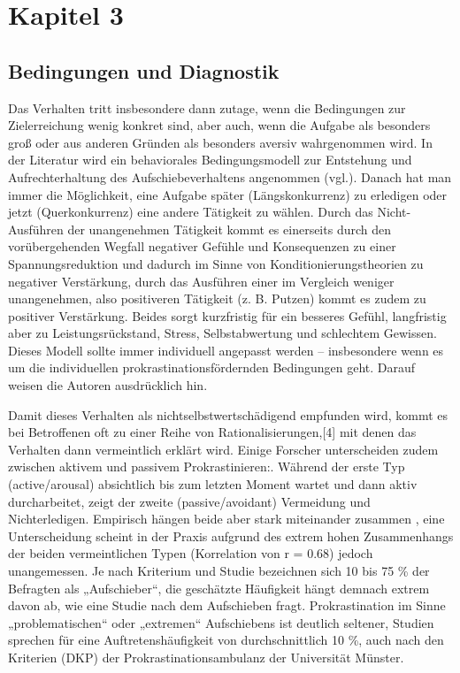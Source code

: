 \chapter{Kapitel 3}
\label{cha:kapitel-3}

\section{Bedingungen und Diagnostik}
\label{sec:diagnostik}
Das Verhalten tritt insbesondere dann zutage, wenn die Bedingungen zur Zielerreichung wenig konkret sind, aber auch, wenn die Aufgabe als besonders groß oder aus anderen Gründen als besonders aversiv wahrgenommen wird. In der Literatur wird ein behaviorales Bedingungsmodell zur Entstehung und Aufrechterhaltung des Aufschiebeverhaltens angenommen (vgl.\cite{hoecker:2013}). Danach hat man immer die Möglichkeit, eine Aufgabe später (Längskonkurrenz) zu erledigen oder jetzt (Querkonkurrenz) eine andere Tätigkeit zu wählen. Durch das Nicht-Ausführen der unangenehmen Tätigkeit kommt es einerseits durch den vorübergehenden Wegfall negativer Gefühle und Konsequenzen zu einer Spannungsreduktion und dadurch im Sinne von Konditionierungstheorien zu negativer Verstärkung, durch das Ausführen einer im Vergleich weniger unangenehmen, also positiveren Tätigkeit (z. B. Putzen) kommt es zudem zu positiver Verstärkung. Beides sorgt kurzfristig für ein besseres Gefühl, langfristig aber zu Leistungsrückstand, Stress, Selbstabwertung und schlechtem Gewissen. Dieses Modell sollte immer individuell angepasst werden – insbesondere wenn es um die individuellen prokrastinationsfördernden Bedingungen geht. Darauf weisen die Autoren ausdrücklich hin.

Damit dieses Verhalten als nichtselbstwertschädigend empfunden wird, kommt es bei Betroffenen oft zu einer Reihe von Rationalisierungen,[4] mit denen das Verhalten dann vermeintlich erklärt wird. Einige Forscher unterscheiden zudem zwischen aktivem und passivem Prokrastinieren:\cite{wiki}. Während der erste Typ (active/arousal) absichtlich bis zum letzten Moment wartet und dann aktiv durcharbeitet, zeigt der zweite (passive/avoidant) Vermeidung und Nichterledigen. Empirisch hängen beide aber stark miteinander zusammen \cite{wiki}, eine Unterscheidung scheint in der Praxis aufgrund des extrem hohen Zusammenhangs der beiden vermeintlichen Typen (Korrelation von r = 0.68) jedoch unangemessen\cite{wiki}. Je nach Kriterium und Studie bezeichnen sich 10 bis 75 \% der Befragten als „Aufschieber“, die geschätzte Häufigkeit hängt demnach extrem davon ab, wie eine Studie nach dem Aufschieben fragt\cite{wiki}. Prokrastination im Sinne „problematischen“ oder „extremen“ Aufschiebens ist deutlich seltener, Studien sprechen für eine Auftretenshäufigkeit von durchschnittlich 10 \%, auch nach den Kriterien (DKP) der Prokrastinationsambulanz der Universität Münster\cite{hoecker:2013}.

